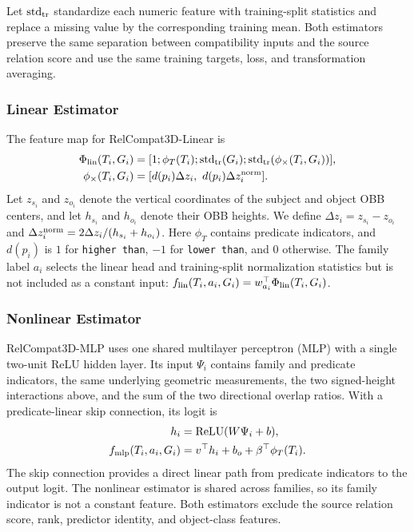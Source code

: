 Let $\operatorname{std}_{\rm tr}$ standardize each numeric feature with training-split statistics and replace a missing value by the corresponding training mean. Both estimators preserve the same separation between compatibility inputs and the source relation score and use the same training targets, loss, and transformation averaging. \subsubsection{Linear Estimator}
The feature map for RelCompat3D-Linear is 
\begin{equation}
\begin{aligned}
\Phi_{\rm lin}(T_i,G_i)&=[1;\phi_T(T_i);\operatorname{std}_{\rm tr}(G_i);
\operatorname{std}_{\rm tr}(\phi_{\times}(T_i,G_i))],\\
\phi_{\times}(T_i,G_i)&=
[d(p_i)\Delta z_i,\ d(p_i)\Delta z_i^{\rm norm}].
\end{aligned}
\end{equation}
Let $z_{s_i}$ and $z_{o_i}$ denote the vertical coordinates of the subject and object OBB centers, and let $h_{s_i}$ and $h_{o_i}$ denote their OBB heights. We define $\Delta z_i=z_{s_i}-z_{o_i}$ and $\Delta z_i^{\rm norm}=2\Delta z_i / (h_{s_i}+h_{o_i})$.
Here $\phi_T$ contains predicate indicators, and $d(p_i)$ is $1$ for \texttt{higher than}, $-1$ for \texttt{lower than}, and $0$ otherwise. The family label $a_i$ selects the linear head and training-split normalization statistics but is not included as a constant input: $f_{\rm lin}(T_i,a_i,G_i)=w_{a_i}^\top\Phi_{\rm lin}(T_i,G_i)$.

\subsubsection{Nonlinear Estimator}
RelCompat3D-MLP uses one shared multilayer perceptron (MLP) with a single two-unit ReLU hidden layer. Its input $\Psi_i$ contains family and predicate indicators, the same underlying geometric measurements, the two signed-height interactions above, and the sum of the two directional overlap ratios. With a predicate-linear skip connection, its logit is
\begin{equation}
\begin{aligned}
h_i&=\operatorname{ReLU}(W\Psi_i+b),\\
f_{\rm mlp}(T_i,a_i,G_i)&=v^\top h_i+b_o+
\beta^\top\phi_T(T_i).
\end{aligned}
\end{equation}
The skip connection provides a direct linear path from predicate indicators to the output logit. The nonlinear estimator is shared across families, so its family indicator is not a constant feature. Both estimators exclude the source relation score, rank, predictor identity, and object-class features.

